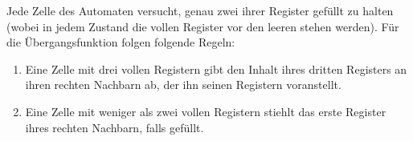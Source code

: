 \documentclass{article}
\begin{document}
Jede Zelle des Automaten versucht, genau zwei ihrer Register gefüllt zu halten (wobei in jedem Zustand die vollen Register vor den leeren stehen werden). Für die Übergangsfunktion folgen folgende Regeln:
\begin{enumerate}
    \item Eine Zelle mit drei vollen Registern gibt den Inhalt ihres dritten Registers an ihren rechten Nachbarn ab, der ihn seinen Registern voranstellt.
        \begin{center}
        \end{center}
    \item Eine Zelle mit weniger als zwei vollen Registern stiehlt das erste Register ihres rechten Nachbarn, falls gefüllt.
        \begin{center}
        \end{center}
\end{enumerate}
\end{document}
